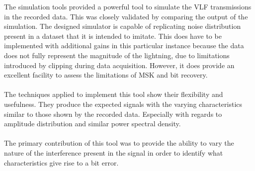 The simulation tools provided a powerful tool to simulate the VLF transmissions in the recorded data. This was closely validated by comparing the output of the simulation. The designed simulator is capable of replicating noise distribution present in a dataset that it is intended to imitate. This does have to be implemented with additional gains in this particular instance because the data does not fully represent the magnitude of the lightning, due to limitations introduced by clipping during data acquisition. However, it does provide an excellent facility to assess the limitations of MSK and bit recovery.
\\\\
The techniques applied to implement this tool show their flexibility and usefulness. They produce the expected signals with the varying characteristics similar to those shown by the recorded data. Especially with regards to amplitude distribution and similar power spectral density.
\\\\
The primary contribution of this tool was to provide the ability to vary the nature of the interference present in the signal in order to identify what characteristics give rise to a bit error.

